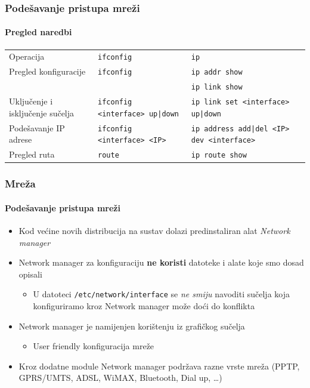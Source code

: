 \documentclass[table,usenames,dvipsnames]{beamer}
\newcommand{\shell}[1]{\texttt{#1}}
\begin{document}
\begin{frame}[t]
	\frametitle{Podešavanje pristupa mreži}
	\framesubtitle{Pregled naredbi}
	\begin{table}[h]
		\begin{tabular}{p{4cm} p{3cm} p{3cm}}
			\rowcolor{BlueViolet!20}Operacija & \shell{ifconfig} & \shell{ip} \\
			Pregled konfiguracije & \shell{ifconfig} & \shell{ip addr show} \\ & & \shell{ip link show} \\
			Uključenje i isključenje sučelja & \shell{ifconfig <interface> up|down} & \shell{ip link set <interface> up|down} \\
			Podešavanje IP adrese & \shell{ifconfig <interface> <IP>} & \shell{ip address add|del <IP> dev <interface>} \\
			Pregled ruta & \shell{route} & \shell{ip route show}
		\end{tabular}
	\end{table}
\end{frame}

\begin{frame}[t]
	\frametitle{Mreža}
	\framesubtitle{Podešavanje pristupa mreži}
	\begin{itemize}
		\item Kod većine novih distribucija na sustav dolazi predinstaliran alat \emph{Network manager}
		\item Network manager za konfiguraciju \textbf{ne koristi} datoteke i alate koje smo dosad opisali
		\begin{itemize}
			\item U datoteci \shell{/etc/network/interface} se \emph{ne smiju} navoditi sučelja koja konfiguriramo kroz Network manager može doći do konflikta
		\end{itemize}
		\item Network manager je namijenjen korištenju iz grafičkog sučelja
		\begin{itemize}
			\item User friendly konfiguracija mreže
		\end{itemize}
		\item Kroz dodatne module Network manager podržava razne vrste mreža {\small (PPTP, GPRS/UMTS, ADSL, WiMAX, Bluetooth, Dial up, \ldots)}
	\end{itemize}
\end{frame}
\end{document}
